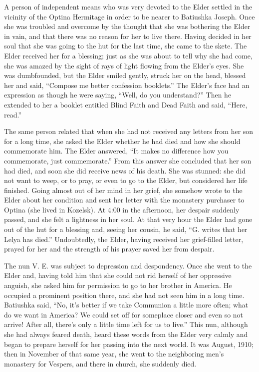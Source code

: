 A person of independent means who was very devoted to the Elder settled in the vicinity of the Optina Hermitage in order to be nearer to Batiushka Joseph. Once she was troubled and overcome by the thought that she was bothering the Elder in vain, and that there was no reason for her to live there. Having decided in her soul that she was going to the hut for the last time, she came to the skete. The Elder received her for a blessing; just as she was about to tell why she had come, she was amazed by the sight of rays of light flowing from the Elder's eyes. She was dumbfounded, but the Elder smiled gently, struck her on the head, blessed her and said, “Compose me better confession booklets.'' The Elder's face had an expression as though he were saying, “Well, do you understand?” Then he extended to her a booklet entitled Blind Faith and Dead Faith and said, “Here, read.”

The same person related that when she had not received any letters from her son for a long time, she asked the Elder whether he had died and how she should commemorate him. The Elder answered, “It makes no difference how you commemorate, just commemorate.” From this answer she concluded that her son had died, and soon she did receive news of his death. She was stunned: she did not want to weep, or to pray, or even to go to the Elder, but considered her life finished. Going almost out of her mind in her grief, she somehow wrote to the Elder about her condition and sent her letter with the monastery purchaser to Optina (she lived in Kozelsk). At 4:00 in the afternoon, her despair suddenly passed, and she felt a lightness in her soul. At that very hour the Elder had gone out of the hut for a blessing and, seeing her cousin, he said, “G. writes that her Lelya has died.” Undoubtedly, the Elder, having received her grief-filled letter, prayed for her and the strength of his prayer saved her from despair.

The nun V. E. was subject to depression and despondency. Once she went to the Elder and, having told him that she could not rid herself of her oppressive anguish, she asked him for permission to go to her brother in America. He occupied a prominent position there, and she had not seen him in a long time. Batiushka said, “No, it's better if we take Communion a little more often; what do we want in America? We could set off for someplace closer and even so not arrive! After all, there's only a little time left for us to live.” This nun, although she had always feared death, heard these words from the Elder very calmly and began to prepare herself for her passing into the next world. It was August, 1910; then in November of that same year, she went to the neighboring men's monastery for Vespers, and there in church, she suddenly died.

